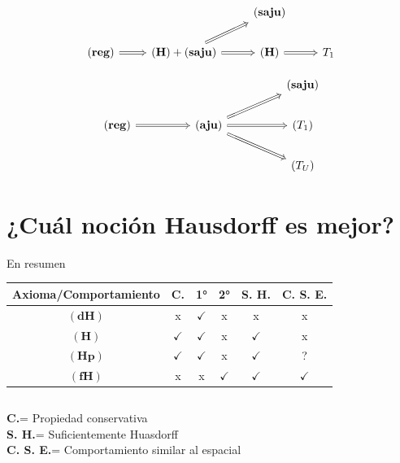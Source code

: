 \documentclass[compress,12pt]{beamer}
\begin{document}
\begin{frame}
\[\begin{tikzcd}
	&& {\mathbf{(saju)}} \\
	{\mathbf{(reg)}} & {\mathbf{(H)}+\mathbf{(saju)}} & {\mathbf{(H)}} & {T_1}
	\arrow[Rightarrow, from=2-1, to=2-2]
	\arrow[Rightarrow, from=2-2, to=1-3]
	\arrow[Rightarrow, from=2-2, to=2-3]
	\arrow[Rightarrow, from=2-3, to=2-4]
\end{tikzcd}\]

\[\begin{tikzcd}
	&&&& {\mathbf{(saju)}} \\
	{\mathbf{(reg)}} && {\mathbf{(aju)}} && {(T_1)} \\
	&&&& {(T_U)}
	\arrow[Rightarrow, from=2-1, to=2-3]
	\arrow[Rightarrow, from=2-3, to=1-5]
	\arrow[Rightarrow, from=2-3, to=2-5]
	\arrow[Rightarrow, from=2-3, to=3-5]
\end{tikzcd}\]

    
\end{frame}

\section{¿Cuál noción Hausdorff es mejor?}

\begin{frame}[standout]{En resumen}

\begin{center}
\begin{tabular}{| c | c | c | c | c | c |}
\hline
 Axioma/Comportamiento & \textbf{C.} & 1° & 2° & \textbf{S. H.} & \textbf{C. S. E.}\\ \hline
$\mathbf{(dH)}$ & x & $\checkmark$ & x & x & x \\ \hline
$\mathbf{(H)}$ & $\checkmark$ & $\checkmark$ & x & $\checkmark$ & x \\ \hline
$\mathbf{(Hp)}$ & $\checkmark$ & $\checkmark$ & x & $\checkmark$ & ? \\ \hline
$\mathbf{(fH)}$ & x & x &  $\checkmark$ & $\checkmark$ & $\checkmark$ \\ \hline
\end{tabular}
\end{center}
\begin{tiny}
$$\mbox{ }$$
\end{tiny}

\textbf{C.}= Propiedad conservativa\\
\textbf{S. H.}= Suficientemente Huasdorff\\
\textbf{C. S. E.}= Comportamiento similar al espacial


    

    
\end{frame}
\end{document}
